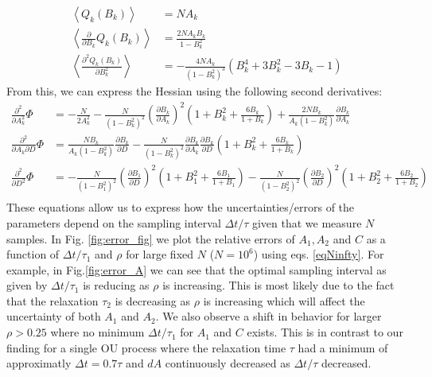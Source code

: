 \documentclass[%
 reprint,
 amsmath,amssymb,
 aps,
]{revtex4-1}
\begin{document}
\begin{equation}
	\begin{aligned}
	\left\langle Q_{k}(B_{k})\right\rangle &= NA_{k}\\
	\left\langle\frac{\partial}{\partial B_{k}}Q_{k}(B_{k})\right\rangle &=  \frac{2NA_{k}B_{k}}{1-B_{k}^{2}}\\
	\left\langle\frac{\partial^{2}Q_{k}(B_{k})}{\partial B_{k}^{2}}\right\rangle &= 
	-\frac{4NA_{k}}{(1-B_{k}^{2})^{3}}\left(B_{k}^{4}+3B_{k}^{2}-3B_{k}-1\right)
	\end{aligned}
\end{equation}
From this, we can express the Hessian using the following second derivatives:
\begin{equation}\label{eqNinfty}
	\begin{aligned}
		\frac{\partial^{2}}{\partial A_{k}^2}\Phi &= -\frac{N}{2A_{k}^{2}} 
		- \frac{N}{(1-B_{k}^{2})^{2}}\left(\frac{\partial B_{k}}{\partial A_{k}}\right)^{2}
		\left(1+B_{k}^{2}+\frac{6B_{k}}{1+B_{k}}\right)+\frac{2NB_{k}}{A_{k}(1-B_{k}^{2})}\frac{\partial B_{k}}{\partial A_{k}}\\
		\frac{\partial^{2}}{\partial A_{k}\partial D}\Phi &=
		\frac{NB_{k}}{A_{k}(1-B_{k}^{2})}\frac{\partial B_{k}}{\partial D}
		-\frac{N}{(1-B_{k}^{2})^{2}}\frac{\partial B_{k}}{\partial A_{k}}\frac{\partial B_{k}}{\partial D}
		\left(1+B_{k}^{2}+\frac{6B_{k}}{1+B_{k}}\right)\\
		\frac{\partial^{2}}{\partial D^2}\Phi &=
		- \frac{N}{(1-B_{1}^{2})^{2}}\left(\frac{\partial B_{1}}{\partial D}\right)^{2}
		\left(1+B_{1}^{2}+\frac{6B_{1}}{1+B_{1}}\right)
		- \frac{N}{(1-B_{2}^{2})^{2}}\left(\frac{\partial B_{2}}{\partial D}\right)^{2}
		\left(1+B_{2}^{2}+\frac{6B_{2}}{1+B_{2}}\right)\\
	\end{aligned}
\end{equation}
These equations allow us to express how the uncertainties/errors of the parameters depend on the sampling interval $\Delta t/\tau$ given that we measure $N$ samples.  In Fig. \ref{fig:error_fig} we plot the relative errors of $A_{1},A_{2}$ and $C$ as a function of $\Delta t/\tau_{1}$ and $\rho$ for large fixed $N$ ($N=10^{6}$) using eqs. \ref{eqNinfty}.  For example, in Fig.\ref{fig:error_A} we can see that the optimal sampling interval as given by $\Delta t/\tau_{1}$ is reducing as $\rho$ is increasing.  This is most likely due to the fact that the relaxation $\tau_{2}$ is decreasing as $\rho$ is increasing which will affect the uncertainty of both $A_{1}$ and $A_{2}$.  We also observe a shift in behavior for larger $\rho>0.25$ where no minimum $\Delta t/\tau_{1}$ for $A_{1}$ and $C$ exists.  This is in contrast to our finding for a single OU process \cite{RN91} where the relaxation time $\tau$ had a minimum of approximatly $\Delta t = 0.7\tau$ and $dA$ continuously decreased as $\Delta t/\tau$ decreased.
\end{document}
